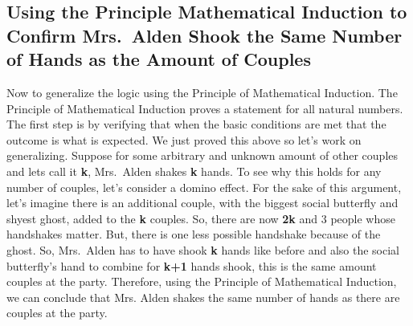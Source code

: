 \documentclass{article}
\begin{document}
\subsection*{Using the Principle Mathematical Induction to Confirm Mrs.\ Alden Shook the Same Number of Hands as the Amount of Couples}
Now to generalize the logic using the Principle of Mathematical Induction. The Principle of Mathematical Induction proves a statement for all natural numbers. The first step is by verifying that when the basic conditions are met that the outcome is what is expected. We just proved this above so let's work on generalizing.
Suppose for some arbitrary and unknown amount of other couples and lets call it \textbf{k}, Mrs.\ Alden shakes  \textbf{k} hands.
To see why this holds for any number of couples, let’s consider a domino effect. For the sake of this argument, let's imagine there is an additional couple, with the biggest social butterfly and shyest ghost, added to the \textbf{k} couples. So, there are now \textbf{2k} and 3 people whose handshakes matter. But, there is one less possible handshake because of the ghost. So, Mrs.\ Alden has to have shook \textbf{k} hands like before and also the social butterfly's hand to combine for \textbf{k+1} hands shook, this is the same amount couples at the party.
Therefore, using the Principle of Mathematical Induction, we can conclude that Mrs. Alden shakes the same number of hands as there are couples at the party.
\end{document}
